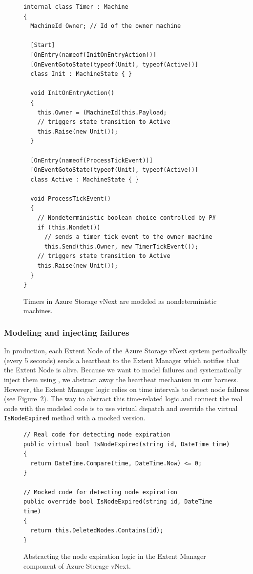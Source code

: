 \begin{figure}[t]
\begin{lstlisting}
internal class Timer : Machine
{
  MachineId Owner; // Id of the owner machine

  [Start]
  [OnEntry(nameof(InitOnEntryAction))]
  [OnEventGotoState(typeof(Unit), typeof(Active))]
  class Init : MachineState { }

  void InitOnEntryAction()
  {
    this.Owner = (MachineId)this.Payload;
    // triggers state transition to Active
    this.Raise(new Unit());
  }

  [OnEntry(nameof(ProcessTickEvent))]
  [OnEventGotoState(typeof(Unit), typeof(Active))]
  class Active : MachineState { }

  void ProcessTickEvent()
  {
    // Nondeterministic boolean choice controlled by P#
    if (this.Nondet())
      // sends a timer tick event to the owner machine
      this.Send(this.Owner, new TimerTickEvent());
    // triggers state transition to Active
    this.Raise(new Unit());
  }
}
\end{lstlisting}
\vspace{-2mm}
\caption{Timers in Azure Storage vNext are modeled as nondeterministic \psharp machines.}
\label{fig:timer}
\end{figure}

\subsubsection{Modeling and injecting failures}
\label{sec:method:model:failures}

In production, each Extent Node of the Azure Storage vNext system periodically (every 5 seconds) sends a heartbeat to the Extent Manager which notifies that the Extent Node is alive. Because we want to model failures and systematically inject them using \psharp, we abstract away the heartbeat mechanism in our harness. However, the Extent Manager logic relies on time intervals to detect node failures (see Figure~\ref{fig:expiration}). The way to abstract this time-related logic and connect the real code with the modeled code is to use virtual dispatch and override the virtual \texttt{IsNodeExpired} method with a mocked version.

\begin{figure}[t]
\begin{lstlisting}
// Real code for detecting node expiration
public virtual bool IsNodeExpired(string id, DateTime time)
{
  return DateTime.Compare(time, DateTime.Now) <= 0;
}

// Mocked code for detecting node expiration
public override bool IsNodeExpired(string id, DateTime time)
{
  return this.DeletedNodes.Contains(id);
}
\end{lstlisting}
\vspace{-2mm}
\caption{Abstracting the node expiration logic in the Extent Manager component of Azure Storage vNext.}
\label{fig:expiration}
\end{figure}

